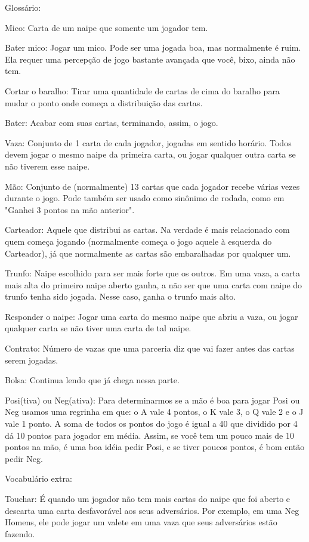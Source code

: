 \begin{subsecao}{Glossário:}

Mico: Carta de um naipe que somente um jogador tem.

Bater mico: Jogar um mico. Pode ser uma jogada boa, mas normalmente é ruim. Ela
requer uma percepção de jogo bastante avançada que você, bixo, ainda não tem.

Cortar o baralho: Tirar uma quantidade de cartas de cima do baralho para mudar
o ponto onde começa a distribuição das cartas.

Bater: Acabar com suas cartas, terminando, assim, o jogo.

Vaza: Conjunto de 1 carta de cada jogador, jogadas em sentido horário. Todos
devem jogar o mesmo naipe da primeira carta, ou jogar qualquer outra carta se
não tiverem esse naipe.

Mão: Conjunto de (normalmente) 13 cartas que cada jogador recebe várias vezes
durante o jogo. Pode também ser usado como sinônimo de rodada, como
em "Ganhei 3 pontos na mão anterior".

Carteador: Aquele que distribui as cartas. Na verdade é mais relacionado com
quem começa jogando (normalmente começa o jogo aquele à esquerda do Carteador),
já que normalmente as cartas são embaralhadas por qualquer um.

Trunfo: Naipe escolhido para ser mais forte que os outros. Em uma vaza, a carta
mais alta do primeiro naipe aberto ganha, a não ser que uma carta com naipe do
trunfo tenha sido jogada. Nesse caso, ganha o trunfo mais alto.

Responder o naipe: Jogar uma carta do mesmo naipe que abriu a vaza, ou jogar
qualquer carta se não tiver uma carta de tal naipe.

Contrato: Número de vazas que uma parceria diz que vai fazer antes das cartas
serem jogadas.

Bolsa: Continua lendo que já chega nessa parte.

Posi(tiva) ou Neg(ativa): Para determinarmos se a mão é boa para jogar Posi ou
Neg usamos uma regrinha em que: o A vale 4 pontos, o K vale 3, o Q vale 2 e o J
vale 1 ponto. A soma de todos os pontos do jogo é igual a 40 que dividido por 4
dá 10 pontos para jogador em média. Assim, se você tem um pouco mais de 10
pontos na mão, é uma boa idéia pedir Posi, e se tiver poucos pontos, é bom
então pedir Neg.

Vocabulário extra:

Touchar: É quando um jogador não tem mais cartas do naipe que foi aberto e
descarta uma carta desfavorável aos seus adversários. Por exemplo, em uma Neg
Homens, ele pode jogar um valete em uma vaza que seus adversários estão fazendo.


\end{subsecao}
